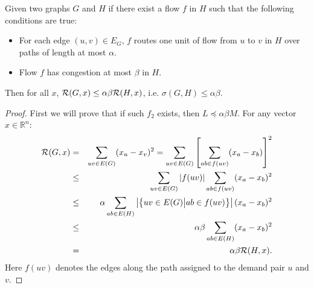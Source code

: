 % 
\begin{lemma}
  \label{thm:dila-cong-suff}
  Given two graphs $G$ and $H$  if there exist a flow $f$
  in $H$ such that the following  conditions are true:
  \begin{itemize}
  \item For each edge $(u,v) \in E_G$, $f$ routes one unit of flow
    from $u$ to $v$ in $H$ over paths of length at most $\alpha$.
  \item Flow $f$ has congestion at most $\beta$ in $H$.
  \end{itemize}
  Then for all $x$, ${\cal R}(G,x) \le \alpha\beta {\cal R}(H,x)$, i.e. $\sigma(G,H) \leq \alpha\beta$.
\end{lemma}
%
\begin{proof}
  First we will prove that if such $f_2$ exists, then
  $L \preceq \alpha\beta M$. For any vector $x\in \mathbb{R}^n$:
  \begin{eqnarray*}
     {\cal R}(G,x)
     & = &
        \sum_{uv\in E(G)}
        (x_u - x_v)^2 
        = \sum_{uv\in E(G)}
        \left[\sum_{ab \in f(uv)} (x_a - x_b)\right]^2 \\
     & \le &
          \sum_{uv\in E(G)}
          |f(uv)| 
          \sum_{ab \in f(uv)} (x_a - x_b)^2 \\
    & \le & \alpha \sum_{ab\in E(H)}
          \left|
          \left\{
          uv \in E(G)
          \big| 
          ab \in f(uv)
          \right\}
          \right|
          (x_a - x_b)^2 \\
        &  \le & \alpha \beta \sum_{ab\in E(H)}
          (x_a - x_b)^2 \\
    & =& \alpha \beta {\cal R}(H,x).
  \end{eqnarray*}
  Here $f(uv)$ denotes the edges along the path
  assigned to the demand pair $u$ and $v$.  	
\end{proof}
%


